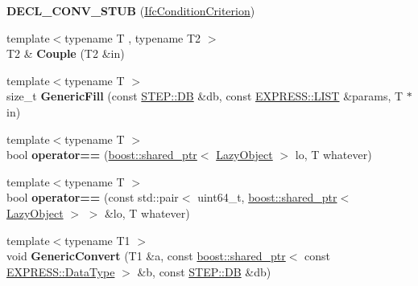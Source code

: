 \begin{DoxyCompactItemize}
\item 
\hypertarget{namespace_assimp_1_1_s_t_e_p_a2e747d68b527a1fb5a88387648b95584}{{\bfseries D\+E\+C\+L\+\_\+\+C\+O\+N\+V\+\_\+\+S\+T\+U\+B} (\hyperlink{struct_assimp_1_1_i_f_c_1_1_ifc_condition_criterion}{Ifc\+Condition\+Criterion})}\label{namespace_assimp_1_1_s_t_e_p_a2e747d68b527a1fb5a88387648b95584}

\item 
\hypertarget{namespace_assimp_1_1_s_t_e_p_a5108c848f477bd4fa33bea9c5a7b3e5c}{{\footnotesize template$<$typename T , typename T2 $>$ }\\T2 \& {\bfseries Couple} (T2 \&in)}\label{namespace_assimp_1_1_s_t_e_p_a5108c848f477bd4fa33bea9c5a7b3e5c}

\item 
\hypertarget{namespace_assimp_1_1_s_t_e_p_a76c8953882bb02f78910a6393731efcc}{{\footnotesize template$<$typename T $>$ }\\size\+\_\+t {\bfseries Generic\+Fill} (const \hyperlink{class_assimp_1_1_s_t_e_p_1_1_d_b}{S\+T\+E\+P\+::\+D\+B} \&db, const \hyperlink{class_assimp_1_1_s_t_e_p_1_1_e_x_p_r_e_s_s_1_1_l_i_s_t}{E\+X\+P\+R\+E\+S\+S\+::\+L\+I\+S\+T} \&params, T $\ast$in)}\label{namespace_assimp_1_1_s_t_e_p_a76c8953882bb02f78910a6393731efcc}

\item 
\hypertarget{namespace_assimp_1_1_s_t_e_p_add8ba818b56ec3e0f8e6f56a2e545002}{{\footnotesize template$<$typename T $>$ }\\bool {\bfseries operator==} (\hyperlink{classboost_1_1shared__ptr}{boost\+::shared\+\_\+ptr}$<$ \hyperlink{class_assimp_1_1_s_t_e_p_1_1_lazy_object}{Lazy\+Object} $>$ lo, T whatever)}\label{namespace_assimp_1_1_s_t_e_p_add8ba818b56ec3e0f8e6f56a2e545002}

\item 
\hypertarget{namespace_assimp_1_1_s_t_e_p_a5a8df59a190a08cdb0f9e9f94d88aed8}{{\footnotesize template$<$typename T $>$ }\\bool {\bfseries operator==} (const std\+::pair$<$ uint64\+\_\+t, \hyperlink{classboost_1_1shared__ptr}{boost\+::shared\+\_\+ptr}$<$ \hyperlink{class_assimp_1_1_s_t_e_p_1_1_lazy_object}{Lazy\+Object} $>$ $>$ \&lo, T whatever)}\label{namespace_assimp_1_1_s_t_e_p_a5a8df59a190a08cdb0f9e9f94d88aed8}

\item 
\hypertarget{namespace_assimp_1_1_s_t_e_p_a96768adedcebf4909da018071af5d886}{{\footnotesize template$<$typename T1 $>$ }\\void {\bfseries Generic\+Convert} (T1 \&a, const \hyperlink{classboost_1_1shared__ptr}{boost\+::shared\+\_\+ptr}$<$ const \hyperlink{class_assimp_1_1_s_t_e_p_1_1_e_x_p_r_e_s_s_1_1_data_type}{E\+X\+P\+R\+E\+S\+S\+::\+Data\+Type} $>$ \&b, const \hyperlink{class_assimp_1_1_s_t_e_p_1_1_d_b}{S\+T\+E\+P\+::\+D\+B} \&db)}\label{namespace_assimp_1_1_s_t_e_p_a96768adedcebf4909da018071af5d886}


\end{DoxyCompactItemize}
